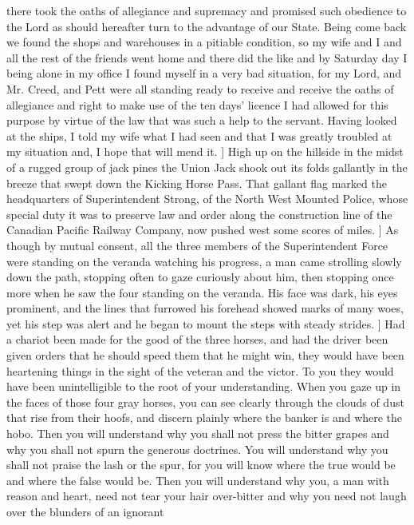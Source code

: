 \documentclass{article} \usepackage{iclr2020_conference,times}
\def\1{\bm{1}}
\begin{document}
{{there took the oaths of allegiance and supremacy and promised such
obedience to the Lord as should hereafter turn to the advantage of our
State. Being come back we found the shops and warehouses in a pitiable
condition, so my wife and I and all the rest of the friends went home and
there did the like and by Saturday day I being alone in my office I found
myself in a very bad situation, for my Lord, and Mr. Creed, and Pett were
all standing ready to receive and receive the oaths of allegiance and right
to make use of the ten days' licence I had allowed for this purpose by
virtue of the law that was such a help to the servant. Having looked at the
ships, I told my wife what I had seen and that I was greatly troubled at my
situation and, I hope that will mend it.
\1\baselineskip]
High up on the hillside in the midst of a rugged group of jack pines the
Union Jack shook out its folds gallantly in the breeze that swept down
the Kicking Horse Pass. That gallant flag marked the headquarters of
Superintendent Strong, of the North West Mounted Police, whose special
duty it was to preserve law and order along the construction line of the
Canadian Pacific Railway Company, now pushed west some scores of miles.
\1\baselineskip]
As though by mutual consent, all the three members of the
Superintendent Force were standing on the veranda watching his
progress, a man came strolling slowly down the path, stopping often
to gaze curiously about him, then stopping once more when he saw the four
standing on the veranda. His face was dark, his eyes prominent, and the
lines that furrowed his forehead showed marks of many woes, yet his
step was alert and he began to mount the steps with steady strides.
\1\baselineskip]
Had a chariot been made for the good of the three horses, and had the driver been given
orders that he should speed them that he might win, they would have
been heartening things in the sight of the veteran and the victor. To
you they would have been unintelligible to the root of your
understanding. When you gaze up in the faces of those four gray
horses, you can see clearly through the clouds of dust that rise from
their hoofs, and discern plainly where the banker is and where the hobo.
Then you will understand why you shall not press the bitter grapes
and why you shall not spurn the generous doctrines. You will understand
why you shall not praise the lash or the spur, for you will know where
the true would be and where the false would be. Then you will understand
why you, a man with reason and heart, need not tear your hair
over-bitter and why you need not laugh over the blunders of an ignorant
}}
\end{document}
